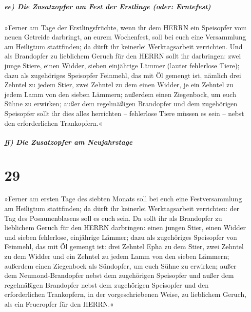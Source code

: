 \hypertarget{ee-die-zusatzopfer-am-fest-der-erstlinge-oder-erntefest}{%
\subparagraph{ee) Die Zusatzopfer am Fest der Erstlinge (oder:
Erntefest)}\label{ee-die-zusatzopfer-am-fest-der-erstlinge-oder-erntefest}}

»Ferner am Tage der Erstlingsfrüchte, wenn ihr dem HERRN
ein Speisopfer vom neuen Getreide darbringt, an eurem Wochenfest, soll
bei euch eine Versammlung am Heiligtum stattfinden; da dürft ihr
keinerlei Werktagsarbeit verrichten. Und als Brandopfer
zu lieblichem Geruch für den HERRN sollt ihr darbringen: zwei junge
Stiere, einen Widder, sieben einjährige Lämmer (lauter fehlerlose
Tiere); dazu als zugehöriges Speisopfer Feinmehl, das mit
Öl gemengt ist, nämlich drei Zehntel zu jedem Stier, zwei Zehntel zu dem
einen Widder, je ein Zehntel zu jedem Lamm von den sieben
Lämmern; außerdem einen Ziegenbock, um euch Sühne zu
erwirken; außer dem regelmäßigen Brandopfer und dem
zugehörigen Speisopfer sollt ihr dies alles herrichten -- fehlerlose
Tiere müssen es sein -- nebst den erforderlichen Trankopfern.«

\hypertarget{ff-die-zusatzopfer-am-neujahrstage}{%
\subparagraph{ff) Die Zusatzopfer am
Neujahrstage}\label{ff-die-zusatzopfer-am-neujahrstage}}

\hypertarget{section-28}{%
\section{29}\label{section-28}}

»Ferner am ersten Tage des siebten Monats soll bei euch
eine Festversammlung am Heiligtum stattfinden; da dürft ihr keinerlei
Werktagsarbeit verrichten: der Tag des Posaunenblasens soll es euch
sein. Da sollt ihr als Brandopfer zu lieblichem Geruch für
den HERRN darbringen: einen jungen Stier, einen Widder und sieben
fehlerlose, einjährige Lämmer; dazu als zugehöriges
Speisopfer von Feinmehl, das mit Öl gemengt ist: drei Zehntel Epha zu
dem Stier, zwei Zehntel zu dem Widder und ein Zehntel zu
jedem Lamm von den sieben Lämmern; außerdem einen
Ziegenbock als Sündopfer, um euch Sühne zu erwirken; außer
dem Neumond-Brandopfer nebst dem zugehörigen Speisopfer und außer dem
regelmäßigen Brandopfer nebst dem zugehörigen Speisopfer und den
erforderlichen Trankopfern, in der vorgeschriebenen Weise, zu lieblichem
Geruch, als ein Feueropfer für den HERRN.«

